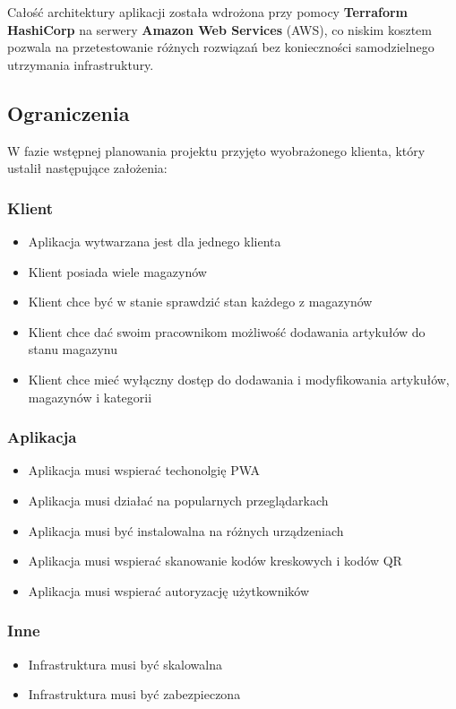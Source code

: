\documentclass[../main.tex]{subfiles}
\begin{document}
        Całość architektury aplikacji została wdrożona przy pomocy \textbf{Terraform HashiCorp}\cite{terraform} na serwery \textbf{Amazon Web Services} (AWS)\cite{aws}, co niskim kosztem pozwala na przetestowanie różnych rozwiązań bez konieczności samodzielnego utrzymania infrastruktury.
    \subsection{Ograniczenia}
        W fazie wstępnej planowania projektu przyjęto wyobrażonego klienta, który ustalił następujące założenia:
        \subsubsection*{Klient}
            \begin{itemize}
                \item Aplikacja wytwarzana jest dla jednego klienta
                \item Klient posiada wiele magazynów
                \item Klient chce być w stanie sprawdzić stan każdego z magazynów
                \item Klient chce dać swoim pracownikom możliwość dodawania artykułów do stanu magazynu
                \item Klient chce mieć wyłączny dostęp do dodawania i modyfikowania artykułów, magazynów i kategorii
            \end{itemize} 
        \subsubsection*{Aplikacja}
            \begin{itemize}
                \item Aplikacja musi wspierać techonolgię PWA
                \item Aplikacja musi działać na popularnych przeglądarkach
                \item Aplikacja musi być instalowalna na różnych urządzeniach
                \item Aplikacja musi wspierać skanowanie kodów kreskowych i kodów QR
                \item Aplikacja musi wspierać autoryzację użytkowników
            \end{itemize}
        \subsubsection*{Inne}
            \begin{itemize}
                \item Infrastruktura musi być skalowalna
                \item Infrastruktura musi być zabezpieczona
            \end{itemize}
\end{document}
